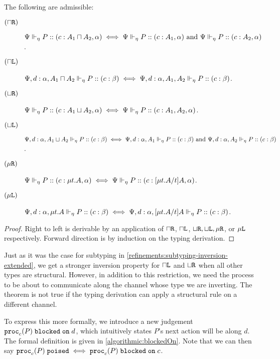 \begin{lemma}[Invertibility]
  \label{algorithmic:property-invertible}
  The following are admissible:
  \begin{description}
    \item[$(\mathbin{\sqcap}\texttt{R})$] ${\Psi} \Vdash_{\eta} P :: (c : A_1 \mathbin{\sqcap} A_2, \alpha) \iff {\Psi} \Vdash_{\eta} P :: (c : A_1, \alpha) \text{ and } {\Psi} \Vdash_{\eta} P :: (c : A_2, \alpha)$.
    \item[$(\mathbin{\sqcap}\texttt{L})$] ${\Psi, d : \alpha, A_1 \mathbin{\sqcap} A_2} \Vdash_{\eta} P :: (c : \beta) \iff {\Psi, d : \alpha, A_1, A_2} \Vdash_{\eta} P :: (c : \beta)$.

    \item[$(\mathbin{\sqcup}\texttt{R})$] ${\Psi} \Vdash_{\eta} P :: (c : A_1 \mathbin{\sqcup} A_2, \alpha) \iff {\Psi} \Vdash_{\eta} P :: (c : A_1, A_2, \alpha)$.
    \item[$(\mathbin{\sqcup}\texttt{L})$] ${\Psi, d : \alpha, A_1 \mathbin{\sqcup} A_2} \Vdash_{\eta} P :: (c : \beta) \iff
    {\Psi, d : \alpha, A_1} \Vdash_{\eta} P :: (c : \beta)
    \text{ and } {\Psi, d : \alpha, A_2} \Vdash_{\eta} P :: (c : \beta)$.

    \item[$(\mu\texttt{R})$] ${\Psi} \Vdash_{\eta} P :: (c : \mu{t} . {A}, \alpha) \iff {\Psi} \Vdash_{\eta} P :: (c : \lbrack{\mu{t} . {A}}/{t}\rbrack{A}, \alpha)$.
    \item[$(\mu\texttt{L})$] ${\Psi, d : \alpha, \mu{t} . {A}} \Vdash_{\eta} P :: (c : \beta) \iff
    {\Psi, d : \alpha, \lbrack{\mu{t} . {A}}/{t}\rbrack{A}} \Vdash_{\eta} P :: (c : \beta)$.
  \end{description}
\end{lemma}
\begin{proof}
  Right to left is derivable by an application of $\mathbin{\sqcap}\texttt{R}$, $\mathbin{\sqcap}\texttt{L}$, $\mathbin{\sqcup}\texttt{R}, \mathbin{\sqcup}\texttt{L}, \mu\texttt{R}$, or $\mu\texttt{L}$ respectively. Forward direction is by induction on the typing derivation.
\end{proof}


Just as it was the case for subtyping in \cref{refinements:subtyping-inversion-extended}, we get a stronger inversion property for $\mathbin{\sqcap}\texttt{L}$ and $\mathbin{\sqcup}\texttt{R}$ when all other types are structural. However, in addition to this restriction, we need the process to be about to communicate along the channel whose type we are inverting. The theorem is not true if the typing derivation can apply a structural rule on a different channel.

To express this more formally, we introduce a new judgement ${\mathtt{proc}_{c}(P)}\;\mathtt{blocked\;on}\;{d}$, which intuitively states $P$'s next action will be along $d$. The formal definition is given in \cref{algorithmic:blockedOn}. Note that we can then say $\mathtt{proc}_{c}(P)\;\mathtt{poised} \iff {\mathtt{proc}_{c}(P)}\;\mathtt{blocked\;on}\;{c}$.

